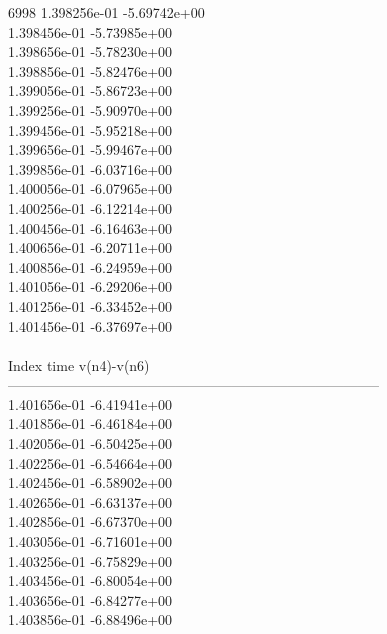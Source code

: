 6998	1.398256e-01	-5.69742e+00	\\ 	1.398456e-01	-5.73985e+00	\\ 	1.398656e-01	-5.78230e+00	\\ 	1.398856e-01	-5.82476e+00	\\ 	1.399056e-01	-5.86723e+00	\\ 	1.399256e-01	-5.90970e+00	\\ 	1.399456e-01	-5.95218e+00	\\ 	1.399656e-01	-5.99467e+00	\\ 	1.399856e-01	-6.03716e+00	\\ 	1.400056e-01	-6.07965e+00	\\ 	1.400256e-01	-6.12214e+00	\\ 	1.400456e-01	-6.16463e+00	\\ 	1.400656e-01	-6.20711e+00	\\ 	1.400856e-01	-6.24959e+00	\\ 	1.401056e-01	-6.29206e+00	\\ 	1.401256e-01	-6.33452e+00	\\ 	1.401456e-01	-6.37697e+00	\\ \hline
\\ \hline
Index   time            v(n4)-v(n6)     \\ \hline
--------------------------------------------------------------------------------\\ 	1.401656e-01	-6.41941e+00	\\ 	1.401856e-01	-6.46184e+00	\\ 	1.402056e-01	-6.50425e+00	\\ 	1.402256e-01	-6.54664e+00	\\ 	1.402456e-01	-6.58902e+00	\\ 	1.402656e-01	-6.63137e+00	\\ 	1.402856e-01	-6.67370e+00	\\ 	1.403056e-01	-6.71601e+00	\\ 	1.403256e-01	-6.75829e+00	\\ 	1.403456e-01	-6.80054e+00	\\ 	1.403656e-01	-6.84277e+00	\\ 	1.403856e-01	-6.88496e+00	\\ \hline
